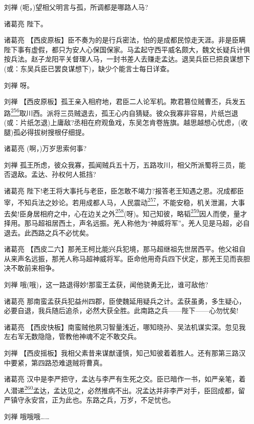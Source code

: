 刘禅 (呃，)望相父明言与孤，所调都是哪路人马?

诸葛亮 陛下。

诸葛亮
【西皮原板】臣不奏为的是行兵密法，怕的是成都民惊走天涯。非是臣瞒陛下事有虚假，都只为安人心保国保家。马孟起守西平威名颇大，魏文长疑兵计俱按兵法。赵子龙阳平关督理人马，一封书差人去赚走孟达。退吴兵臣已把良谋想下(或：东吴兵臣已罢良谋想下)，缺少个能言士每日详查。

刘禅 呀。

刘禅
【西皮原板】孤王亲入相府地，君臣二人论军机。欺君篡位贼曹丕，兵发五路\protect\hyperlink{fn256}{\textsuperscript{256}}取川西。派将三员贼退去，孤王心内自猜疑。彼众我寡非容易，片纸岂退(或：片纸怎退)上庸敌?丞相在府观鱼戏，东吴怎肯卷旌旗。越思越想心忧虑，(收腿)孤必得拔树搜根仔细提。

诸葛亮 (啊，)万岁思索何事?

刘禅
孤王所虑，彼众我寡，孤闻贼兵五十万，五路攻川，相父所派蜀将三员，能否退敌。孟达、孙权何人抵挡?

诸葛亮
陛下!老王将大事托与老臣，臣怎敢不竭力?报答老王知遇之恩。况成都臣宰，不知兵法之妙论。若用成都人马，人民震动\protect\hyperlink{fn257}{\textsuperscript{257}}，不能安稳，机关泄漏，大事去矣!臣身居相府之中，心在边关之外\protect\hyperlink{fn258}{\textsuperscript{258}}(呀)。知己知彼，略韬\protect\hyperlink{fn259}{\textsuperscript{259}}因人而使，量才择用。那马超祖居西土，声名远振。羌人称他为``神威将军''。羌人见是马超，必自退去。此西路之兵不必忧矣。

诸葛亮
【西皮二六】那羌王柯比能兴兵犯境，那马超继祖先世居西平。他父祖自从来声名远振，那羌人称马超神威将军。臣命他用奇兵四下伏定，那羌王见而丧胆决不敢前来相争。

刘禅 哦(哦)，这一路退得妙!那蛮王孟获，闻他骁勇无比，谁可敌他?

诸葛亮
那南蛮孟获兵犯益州四郡，臣使魏延用疑兵之计。孟获虽勇，多生疑心，必要自退，我兵随后追杀，必然大获全胜。此南路之兵------陛下------心勿忧矣!

诸葛亮
【西皮快板】南蛮贼他夙习智量浅近，哪知晓孙、吴法机谋实深。忽见我左右军无数隐隐，管教他神魂不定不敢交兵。

刘禅
【西皮摇板】我相父素昔来谋猷谨慎，知己知彼着着胜人。还有那第三路汉中要紧，第四路恐难退贼将曹真。

诸葛亮
汉中是李严把守，孟达与李严有生死之交。臣已暗作一书，如严亲笔，着人潜递\protect\hyperlink{fn260}{\textsuperscript{260}}孟达，孟达见之，必然推病不出。况孟达并非李严对手，臣回成都，留严镇守永安宫，正为此也。东路之兵，万岁，不足忧也。

刘禅 哦哦哦\ldots{}\ldots{}

